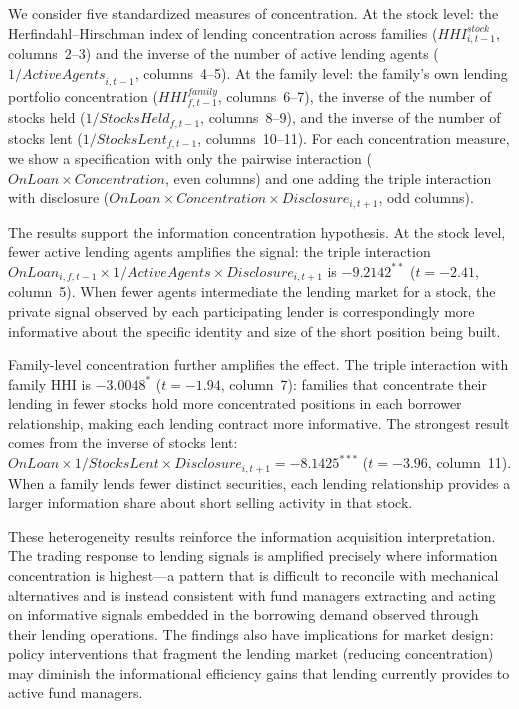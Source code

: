 We consider five standardized measures of concentration. At the stock level: the Herfindahl--Hirschman index of lending concentration across families ($\mathit{HHI}^{\mathit{stock}}_{i,t-1}$, columns~2--3) and the inverse of the number of active lending agents ($1/\mathit{ActiveAgents}_{i,t-1}$, columns~4--5). At the family level: the family's own lending portfolio concentration ($\mathit{HHI}^{\mathit{family}}_{f,t-1}$, columns~6--7), the inverse of the number of stocks held ($1/\mathit{StocksHeld}_{f,t-1}$, columns~8--9), and the inverse of the number of stocks lent ($1/\mathit{StocksLent}_{f,t-1}$, columns~10--11). For each concentration measure, we show a specification with only the pairwise interaction ($OnLoan \times \mathit{Concentration}$, even columns) and one adding the triple interaction with disclosure ($OnLoan \times \mathit{Concentration} \times \mathit{Disclosure}_{i,t+1}$, odd columns).

The results support the information concentration hypothesis. At the stock level, fewer active lending agents amplifies the signal: the triple interaction $OnLoan_{i,f,t-1} \times 1/\mathit{ActiveAgents} \times \mathit{Disclosure}_{i,t+1}$ is $-9.2142^{**}$ ($t = -2.41$, column~5). When fewer agents intermediate the lending market for a stock, the private signal observed by each participating lender is correspondingly more informative about the specific identity and size of the short position being built.

Family-level concentration further amplifies the effect. The triple interaction with family HHI is $-3.0048^{*}$ ($t = -1.94$, column~7): families that concentrate their lending in fewer stocks hold more concentrated positions in each borrower relationship, making each lending contract more informative. The strongest result comes from the inverse of stocks lent: $OnLoan \times 1/\mathit{StocksLent} \times \mathit{Disclosure}_{i,t+1} = -8.1425^{***}$ ($t = -3.96$, column~11). When a family lends fewer distinct securities, each lending relationship provides a larger information share about short selling activity in that stock.

These heterogeneity results reinforce the information acquisition interpretation. The trading response to lending signals is amplified precisely where information concentration is highest---a pattern that is difficult to reconcile with mechanical alternatives and is instead consistent with fund managers extracting and acting on informative signals embedded in the borrowing demand observed through their lending operations. The findings also have implications for market design: policy interventions that fragment the lending market (reducing concentration) may diminish the informational efficiency gains that lending currently provides to active fund managers.
